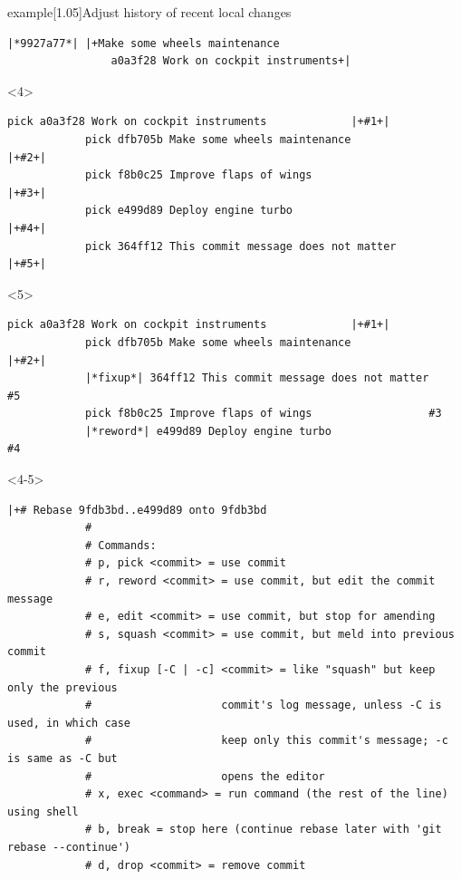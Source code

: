 \documentclass[usenames,svgnames,14pt]{beamer}
\begin{document}
\begin{frame}[c,fragile]
\begin{varblock}{example}[1.05\textwidth]{Adjust history of recent local changes}
\begin{uncoverenv}
\begin{lstlisting}[style=MyBash, aboveskip=-4pt]
                |*9927a77*| |+Make some wheels maintenance
                a0a3f28 Work on cockpit instruments+|
            \end{lstlisting}
        \end{uncoverenv}
    \end{varblock}
    \begin{onlyenv}<4>
        \begin{lstlisting}[style=MyBash]
            pick a0a3f28 Work on cockpit instruments             |+#1+|
            pick dfb705b Make some wheels maintenance            |+#2+|
            pick f8b0c25 Improve flaps of wings                  |+#3+|
            pick e499d89 Deploy engine turbo                     |+#4+|
            pick 364ff12 This commit message does not matter     |+#5+|
        \end{lstlisting}
    \end{onlyenv}
    \begin{onlyenv}<5>
        \begin{lstlisting}[style=MyBash]
            pick a0a3f28 Work on cockpit instruments             |+#1+|
            pick dfb705b Make some wheels maintenance            |+#2+|
            |*fixup*| 364ff12 This commit message does not matter    #5
            pick f8b0c25 Improve flaps of wings                  #3
            |*reword*| e499d89 Deploy engine turbo                   #4
        \end{lstlisting}
    \end{onlyenv}
    \begin{onlyenv}<4-5>
        \begin{lstlisting}[style=MyBash, basicstyle=\ttfamily\tiny\color{basic-color}, aboveskip=-4pt]
            |+# Rebase 9fdb3bd..e499d89 onto 9fdb3bd
            #
            # Commands:
            # p, pick <commit> = use commit
            # r, reword <commit> = use commit, but edit the commit message
            # e, edit <commit> = use commit, but stop for amending
            # s, squash <commit> = use commit, but meld into previous commit
            # f, fixup [-C | -c] <commit> = like "squash" but keep only the previous
            #                    commit's log message, unless -C is used, in which case
            #                    keep only this commit's message; -c is same as -C but
            #                    opens the editor
            # x, exec <command> = run command (the rest of the line) using shell
            # b, break = stop here (continue rebase later with 'git rebase --continue')
            # d, drop <commit> = remove commit

\end{lstlisting}
\end{onlyenv}
\end{frame}
\end{document}
